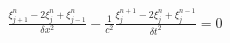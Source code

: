 \documentclass[preview]{standalone}
\begin{document}
\begin{align*}
\frac{\xi_{j+1}^{n} - 2 \xi_{j}^{n} + \xi_{j-1}^{n}}{\delta x^2} - \frac{1}{c^2}\frac{\xi_{j}^{n+1} - 2 \xi_{j}^{n} + \xi_{j}^{n-1}}{\delta t^2}  = 0
\end{align*}
\end{document}
